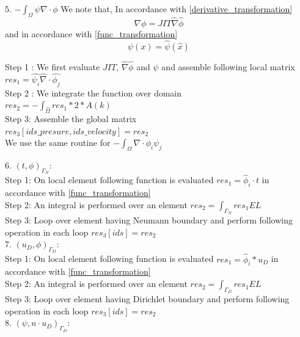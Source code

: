 \documentclass[a4paper,12pt]{book}
\begin{document}
5. $-\int_{\Omega} \psi \nabla \cdot \phi$
We note that, In accordance with \ref{derivative_transformation}\begin{equation}
\nabla \phi = JIT \hat{\nabla} \hat{\phi}
\end{equation}
and in accordance with \ref{func_transformation}
\begin{equation}
\psi(x) = \hat{\psi} (\hat{x})
\end{equation}

Step 1 : We first evaluate $JIT$, $\hat{\nabla} \hat{\phi}$ and $\psi$ and assemble following local matrix\\
$res_1 = \hat{\psi_i} \hat{\nabla} \cdot \hat{\phi_j}$\\

Step 2 : We integrate the function over domain\\
$res_2 = -\int_{\hat{\Omega}} res_1 * 2 * A(k)$\\

Step 3: Assemble the global matrix\\
$res_3[ids\_presure,ids\_velocity] = res_2$\\

We use the same routine for $-\int_{\Omega} \nabla \cdot \phi_i \psi_j $

6. $(t,\phi)_{\Gamma_N}$:
\\

Step 1: On local element following function is evaluated $res_1=\hat{\phi}_i \cdot t$ in accordance with \ref{func_transformation}\\
Step 2: An integral is performed over an element $res_2=\int_{\Gamma_N} res_1 EL $\\
Step 3: Loop over element having Neumann boundary and perform following operation in each loop $res_3[ids]=res_2$\\

7. $(u_D,\phi)_{\Gamma_D}$:
\\

Step 1: On local element following function is evaluated $res_1=\hat{\phi}_i*u_D$ in accordance with \ref{func_transformation}\\
Step 2: An integral is performed over an element $res_2=\int_{\Gamma_D} res_1 EL $\\
Step 3: Loop over element having Dirichlet boundary and perform following operation in each loop $res_3[ids]=res_2$\\

8. $(\psi, n \cdot u_D)_{\Gamma_D} $:
\end{document}
